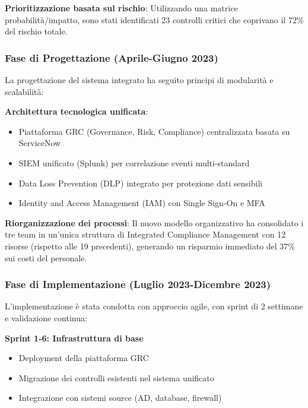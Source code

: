 \textbf{Prioritizzazione basata sul rischio}: Utilizzando una matrice probabilità/impatto, sono stati identificati 23 controlli critici che coprivano il 72\% del rischio totale.

\subsubsection{\texorpdfstring{Fase di Progettazione (Aprile-Giugno 2023)}{4.7.2.2 - Fase di Progettazione (Aprile-Giugno 2023)}}

La progettazione del sistema integrato ha seguito principi di modularità e scalabilità:

\textbf{Architettura tecnologica unificata}:
\begin{itemize}
    \item Piattaforma GRC (Governance, Risk, Compliance) centralizzata basata su ServiceNow
    \item SIEM unificato (Splunk) per correlazione eventi multi-standard
    \item Data Loss Prevention (DLP) integrato per protezione dati sensibili
    \item Identity and Access Management (IAM) con Single Sign-On e MFA
\end{itemize}

\textbf{Riorganizzazione dei processi}:
Il nuovo modello organizzativo ha consolidato i tre team in un'unica struttura di Integrated Compliance Management con 12 risorse (rispetto alle 19 precedenti), generando un risparmio immediato del 37\% sui costi del personale.

\subsubsection{\texorpdfstring{Fase di Implementazione (Luglio 2023-Dicembre 2023)}{4.7.2.3 - Fase di Implementazione (Luglio 2023-Dicembre 2023)}}

L'implementazione è stata condotta con approccio agile, con sprint di 2 settimane e validazione continua:

\textbf{Sprint 1-6: Infrastruttura di base}
\begin{itemize}
    \item Deployment della piattaforma GRC
    \item Migrazione dei controlli esistenti nel sistema unificato
    \item Integrazione con sistemi source (AD, database, firewall)
\end{itemize}

